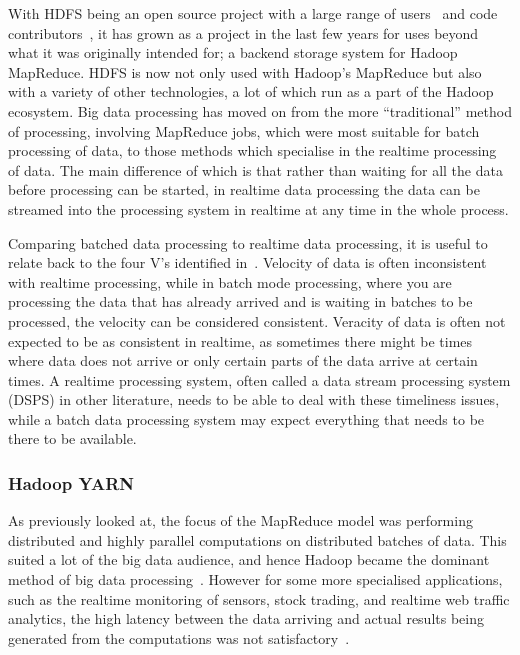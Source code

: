 \documentclass[a4paper,11pt]{article}
\begin{document}
With HDFS being an open source project with a large range of users~\cite{hadoop_users} and code
contributors~\cite{hadoop_committers}, it has grown as a project in the last few years for uses beyond what it was
originally intended for; a backend storage system for Hadoop MapReduce. HDFS is now not only used with Hadoop's
MapReduce but also with a variety of other technologies, a lot of which run as a part of the Hadoop ecosystem.
Big data processing has moved on from the more ``traditional'' method of processing, involving MapReduce jobs, which
were most suitable for batch processing of data, to those methods which specialise in the realtime processing of data.
The main difference of which is that rather than waiting for all the data before processing can be started, in realtime
data processing the data can be streamed into the processing system in realtime at any time in the whole process.

Comparing batched data processing to realtime data processing, it is useful to relate back to the four V's
identified in~. Velocity of data is often inconsistent with realtime processing, while in batch mode
processing, where you are processing the data that has already arrived and is waiting in batches to be processed, the
velocity can be considered consistent. Veracity of data is often not expected to be as consistent in realtime, as
sometimes there might be times where data does not arrive or only certain parts of the data arrive at certain times.
A realtime processing system, often called a data stream processing system (DSPS) in other literature, needs to be able
to deal with these timeliness issues, while a batch data processing system may expect everything that needs to be there
to be available.

\subsubsection{Hadoop YARN} %
\label{ssub:apache_hadoop_yarn_}

As previously looked at, the focus of the MapReduce model was performing distributed and highly parallel computations
on distributed batches of data. This suited a lot of the big data audience, and hence Hadoop became the dominant
method of big data processing~\cite{liu_survey_2014}. However for some more specialised applications, such as
the realtime monitoring of sensors, stock trading, and realtime web traffic analytics, the high latency between the data
arriving and actual results being generated from the computations was not satisfactory~\cite{kamburugamuve_survey_2014}.
\end{document}

